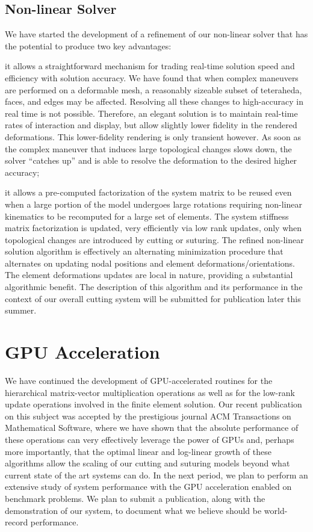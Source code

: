 \subsection{Non-linear Solver}
We have started the development of a refinement of our non-linear solver that has the potential to produce two key advantages:
\begin{inparaenum}[(1)]
  \item it allows a straightforward mechanism for trading real-time solution speed and efficiency with solution accuracy.  We have found that when complex maneuvers are performed on a deformable mesh, a reasonably sizeable subset of teteraheda, faces, and edges may be affected. Resolving all these changes to high-accuracy in real time is not possible. Therefore, an elegant solution is to maintain real-time rates of interaction and display, but allow slightly lower fidelity in the rendered deformations.  This lower-fidelity rendering is only transient however. As soon as the complex maneuver that induces large topological changes slows down, the solver “catches up” and is able to resolve the deformation to the desired higher accuracy;
  \item it allows a pre-computed factorization of the system matrix to be reused even when a large portion of the model undergoes large rotations requiring non-linear kinematics to be recomputed for a large set of elements. The system stiffness matrix factorization is updated, very efficiently via low rank updates, only when topological changes are introduced by cutting or suturing.  The refined non-linear solution algorithm is effectively an alternating minimization procedure that alternates on updating nodal positions and element deformations/orientations. The element deformations updates are local in nature, providing a substantial algorithmic benefit. The description of this algorithm and its performance in the context of our overall cutting system will be submitted for publication later this summer.
\end{inparaenum}

\section{GPU Acceleration}
We have continued the development of GPU-accelerated routines for the hierarchical matrix-vector multiplication operations as well as for the low-rank update operations involved in the finite element solution. Our recent publication on this subject was accepted by the prestigious journal ACM Transactions on Mathematical Software, where we have shown that the absolute performance of these operations can very effectively leverage the power of GPUs and, perhaps more importantly, that the optimal linear and log-linear growth of these algorithms allow the scaling of our cutting and suturing models beyond what current state of the art systems can do.  In the next period, we plan to perform an extensive study of system performance with the GPU acceleration enabled on benchmark problems. We plan to submit a publication, along with the demonstration of our system, to document what we believe should be world-record performance.

